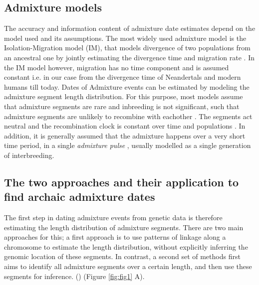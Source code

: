\documentclass[]{article}
\begin{document}
\subsection{Admixture models}\label{Admixture models}

The accuracy and information content of admixture date estimates depend on the model used and its assumptions. The most widely used admixture model is the Isolation-Migration model (IM), that models divergence of two populations from an ancestral one by jointly estimating the divergence time and migration rate \citep{nielsen_distinguishing_2001,hey_multilocus_2004}. In the IM model however, migration has no time component and is assumed constant i.e. in our case from the divergence time of Neandertals and modern humans till today. Dates of Admixture events can be estimated by modeling the admixture segment length distribution. For this purpose, most models assume that admixture segments are rare and inbreeding is not significant, such that admixture segments are unlikely to recombine with eachother \citep{pool_inference_2009,liang_lengths_2014}. The segments act neutral \citep{shchur_distribution_2019} and the recombination clock is constant over time and populations \citep{gravel_population_2012}. In addition, it is generally assumed that the admixture happens over a very short time period, in a single \textit{admixture pulse} \citep{moorjani_history_2011}, usually modelled as a single generation of interbreeding.


\subsection{The two approaches and their application to find archaic admixture dates}\label{the-two-approaches-and-their-application-to-find-archaic-admixture-dates}

The first step in dating admixture events from genetic data is therefore estimating the length distribution of admixture segments.  There are two main approaches for this; a first approach is to use patterns of linkage along a chromosome to estimate the length distribution, without explicitly inferring the genomic location of these segments. In contrast, a second set of methods first aims to identify all admixture segments over a certain length, and then use these segments for inference. 
(\citep{chimusa_dating_2018}) (Figure \ref{fig:fig1} A).
\end{document}
